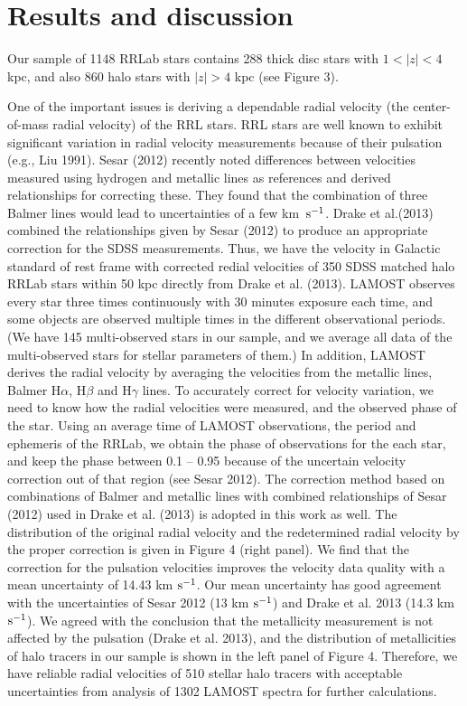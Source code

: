 \documentclass[12pt,preprint]{aastex}
\begin{document}
\section{Results and discussion}

Our sample of 1148 RRLab stars contains 288 thick disc stars with $1
< |z| < 4$ kpc, and also 860 halo stars with $|z| > 4$ kpc (see
Figure 3).

One of the important issues is deriving a dependable radial velocity
(the center-of-mass radial velocity) of the RRL stars. RRL stars are
well known to exhibit significant variation in radial velocity
measurements because of their pulsation (e.g., Liu 1991). Sesar
(2012) recently noted differences between velocities measured using
hydrogen and metallic lines as references and derived relationships
for correcting these. They found that the combination of three
Balmer lines would lead to uncertainties of a few km $\,\rm s^{-1}$.
Drake et al.(2013) combined the relationships given by Sesar (2012)
to produce an appropriate correction for the SDSS measurements.
Thus, we have the velocity in Galactic standard of rest frame with
corrected redial velocities of 350 SDSS matched halo RRLab stars within 50 kpc
directly from Drake et al. (2013). LAMOST observes every star three
times continuously with 30 minutes exposure each time, and some
objects are observed multiple times in the different observational
periods. (We have 145 multi-observed stars in our sample, and we
average all data of the multi-observed stars for stellar parameters
of them.) In addition, LAMOST derives the radial velocity by
averaging the velocities from the metallic lines, Balmer H$\alpha$,
H$\beta$ and H$\gamma$ lines. To accurately correct for velocity
variation, we need to know how the radial velocities were measured,
and the observed phase of the star. Using an average time of LAMOST
observations, the period and ephemeris of the RRLab, we obtain the
phase of observations for the each star, and keep the phase between
0.1 -- 0.95 because of the uncertain velocity correction out of that
region (see Sesar 2012). The correction method based on combinations
of Balmer and metallic lines with combined  relationships of Sesar
(2012) used in Drake et al. (2013) is adopted in this work as well.
The distribution of the original radial velocity and the
redetermined radial velocity by the proper correction is given in
Figure 4 (right panel). We find that the correction for the
pulsation velocities improves the velocity data quality with a mean
uncertainty of 14.43 km ${\rm s}^{-1}$. Our mean uncertainty has
good agreement with the uncertainties of Sesar 2012 (13 km ${\rm
s}^{-1}$) and Drake et al. 2013 (14.3 km ${\rm s}^{-1}$). We agreed
with the conclusion that the metallicity measurement is not affected
by the pulsation (Drake et al. 2013), and the distribution of
metallicities of halo tracers in our sample is shown in the left
panel of Figure 4. Therefore, we have reliable radial velocities of
510 stellar halo tracers with acceptable uncertainties from analysis of 1302
LAMOST spectra for further calculations.
\end{document}

